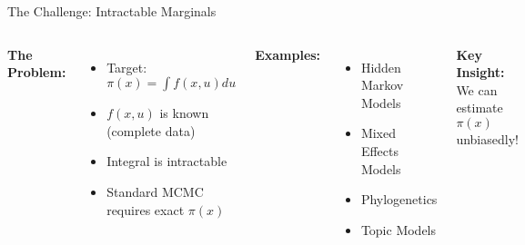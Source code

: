 \documentclass[aspectratio=169]{beamer}
\begin{document}
\begin{frame}{The Challenge: Intractable Marginals}
\vspace{0.5cm}

\begin{columns}
\textbf{The Problem:}
\begin{itemize}
    \item Target: $\pi(x) = \int f(x,u) du$
    \item $f(x,u)$ is known (complete data)
    \item Integral is \textcolor{copenhagenred}{intractable}
    \item Standard MCMC requires exact $\pi(x)$
\end{itemize}

\vspace{0.5cm}
\textbf{Examples:}
\begin{itemize}
    \item Hidden Markov Models
    \item Mixed Effects Models
    \item Phylogenetics
    \item Topic Models
\end{itemize}


\vspace{0.5cm}
\textbf{Key Insight:} We can \textcolor{copenhagenred}{estimate} $\pi(x)$ unbiasedly!
\end{columns}
\end{frame}
\end{document}
